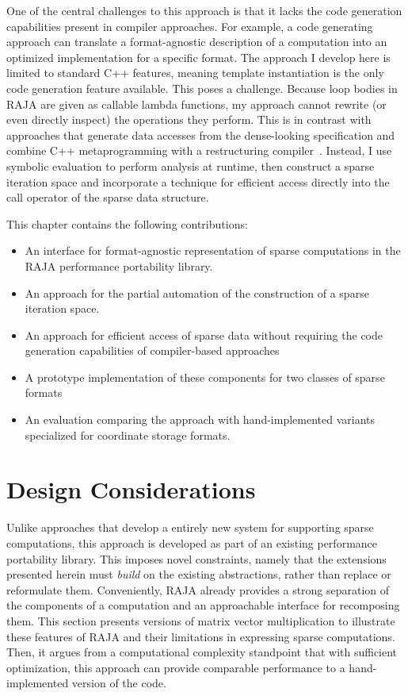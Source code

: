 One of the central challenges to this approach is that it lacks the code generation capabilities present in compiler approaches.
For example, a code generating approach can translate a format-agnostic description of a computation into an optimized implementation for a specific format.
The approach I develop here is limited to standard C++ features, meaning template instantiation is the only code generation feature available.
This poses a challenge.
Because loop bodies in RAJA are given as callable lambda functions, my approach cannot rewrite (or even directly inspect) the operations they perform.
This is in contrast with approaches that generate data accesses from the dense-looking specification and combine C++ metaprogramming with a restructuring compiler~\cite{ahmed2000compiling,ahmed2000framework}.
Instead, I use symbolic evaluation to perform analysis at runtime, then construct a sparse iteration space and incorporate a technique for efficient access directly into the call operator of the sparse data structure.

This chapter contains the following contributions:
\begin{itemize}
\item An interface for format-agnostic representation of sparse computations in the RAJA performance portability library.
\item An approach for the partial automation of the construction of a sparse iteration space.
\item An approach for efficient access of sparse data without requiring the code generation capabilities of compiler-based approaches
\item A prototype implementation of these components for two classes of sparse formats
\item An evaluation comparing the approach with hand-implemented variants specialized for coordinate storage formats.
\end{itemize}


\section{Design Considerations}

Unlike approaches that develop a entirely new system for supporting sparse computations, this approach is developed as part of an existing performance portability library.
This imposes novel constraints, namely that the extensions presented herein must \textit{build} on the existing abstractions, rather than replace or reformulate them.
Conveniently, RAJA already provides a strong separation of the components of a computation and an approachable interface for recomposing them.
This section presents versions of matrix vector multiplication to illustrate these features of RAJA and their limitations in expressing sparse computations.
Then, it argues from a computational complexity standpoint that with sufficient optimization, this approach can provide comparable performance to a hand-implemented version of the code.

